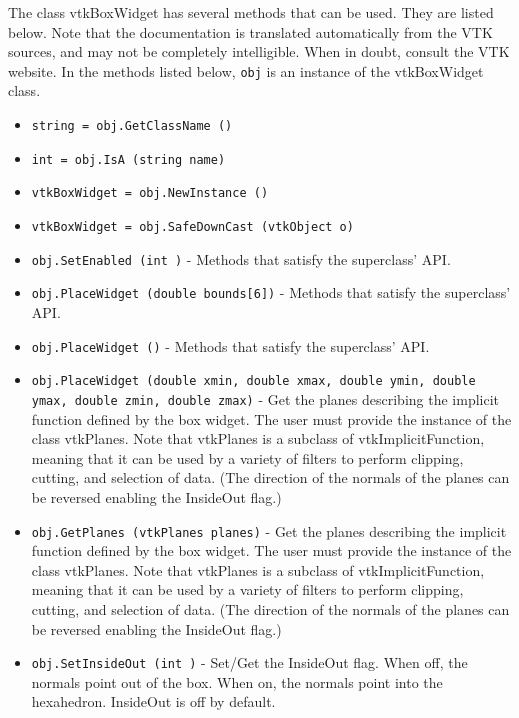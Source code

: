 The class vtkBoxWidget has several methods that can be used.
  They are listed below.
Note that the documentation is translated automatically from the VTK sources,
and may not be completely intelligible.  When in doubt, consult the VTK website.
In the methods listed below, \verb|obj| is an instance of the vtkBoxWidget class.
\begin{itemize}
\item  \verb|string = obj.GetClassName ()|

\item  \verb|int = obj.IsA (string name)|

\item  \verb|vtkBoxWidget = obj.NewInstance ()|

\item  \verb|vtkBoxWidget = obj.SafeDownCast (vtkObject o)|

\item  \verb|obj.SetEnabled (int )| -  Methods that satisfy the superclass' API.

\item  \verb|obj.PlaceWidget (double bounds[6])| -  Methods that satisfy the superclass' API.

\item  \verb|obj.PlaceWidget ()| -  Methods that satisfy the superclass' API.

\item  \verb|obj.PlaceWidget (double xmin, double xmax, double ymin, double ymax, double zmin, double zmax)| -  Get the planes describing the implicit function defined by the box
 widget. The user must provide the instance of the class vtkPlanes. Note
 that vtkPlanes is a subclass of vtkImplicitFunction, meaning that it can
 be used by a variety of filters to perform clipping, cutting, and
 selection of data.  (The direction of the normals of the planes can be
 reversed enabling the InsideOut flag.)

\item  \verb|obj.GetPlanes (vtkPlanes planes)| -  Get the planes describing the implicit function defined by the box
 widget. The user must provide the instance of the class vtkPlanes. Note
 that vtkPlanes is a subclass of vtkImplicitFunction, meaning that it can
 be used by a variety of filters to perform clipping, cutting, and
 selection of data.  (The direction of the normals of the planes can be
 reversed enabling the InsideOut flag.)

\item  \verb|obj.SetInsideOut (int )| -  Set/Get the InsideOut flag. When off, the normals point out of the
 box. When on, the normals point into the hexahedron.  InsideOut
 is off by default.


\end{itemize}
